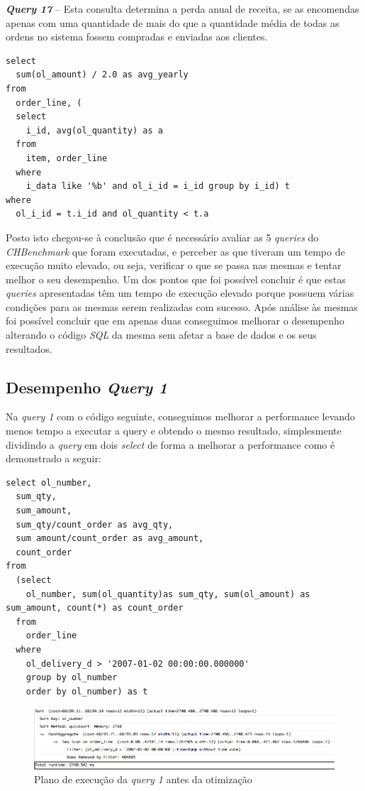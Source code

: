 \textbf{\textit{Query 17}} – Esta consulta determina a perda anual de receita, se as encomendas apenas com uma quantidade de mais do que a quantidade média de todas as ordens no sistema fossem compradas e enviadas aos clientes.

\begin{verbatim}
select
  sum(ol_amount) / 2.0 as avg_yearly
from
  order_line, (
  select
    i_id, avg(ol_quantity) as a
  from
    item, order_line
  where
    i_data like '%b' and ol_i_id = i_id group by i_id) t
where
  ol_i_id = t.i_id and ol_quantity < t.a
\end{verbatim}


Posto isto chegou-se à conclusão que é necessário avaliar as 5 \textit{queries} do \textit{CHBenchmark} que foram executadas, e perceber as que tiveram um tempo de execução muito elevado, ou seja, verificar o que se passa nas mesmas e tentar melhor o seu desempenho. Um dos pontos que foi possível concluir é que estas \textit{queries} apresentadas têm um tempo de execução elevado porque possuem várias condições para as mesmas serem realizadas com sucesso. Após análise às mesmas foi possível concluir que em apenas duas conseguimos melhorar o desempenho alterando o código \textit{SQL} da mesma sem afetar a base de dados e os seus resultados.\\

\newpage

\subsection{Desempenho \textit{Query 1}}

Na \textit{query 1} com o código seguinte, conseguimos melhorar a performance levando menos tempo a executar a query e obtendo o mesmo resultado, simplesmente dividindo a \textit{query} em dois \textit{select} de forma a melhorar a performance como é demonstrado a seguir:

\begin{verbatim}
select ol_number,
  sum_qty,
  sum_amount,
  sum_qty/count_order as avg_qty,
  sum amount/count_order as avg_amount,
  count_order
from
  (select
    ol_number, sum(ol_quantity)as sum_qty, sum(ol_amount) as sum_amount, count(*) as count_order
  from
    order_line
  where
    ol_delivery_d > '2007-01-02 00:00:00.000000'
    group by ol_number
    order by ol_number) as t
\end{verbatim}

\begin{figure}[ht!]
\centering
\includegraphics[width=\textwidth]{img/00_query1_pos}
\caption{Plano de execução da \textit{query 1} antes da otimização \label{overflow}}
\end{figure}


